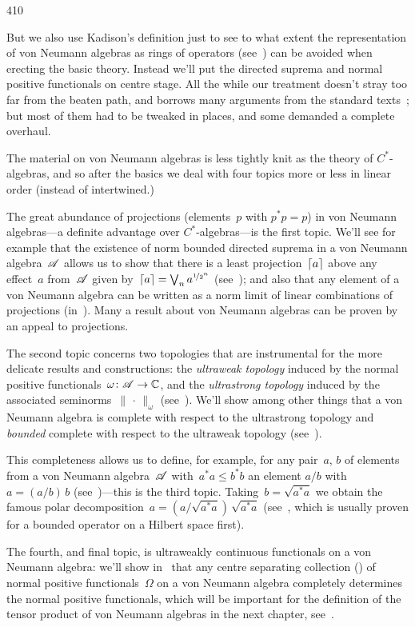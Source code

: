 \begin{parsec}{410}
\begin{point}{10}
But we also use Kadison's definition
just to see
to what extent the representation
of von Neumann algebras
as rings of operators (see~) can be avoided
when erecting the basic theory.
Instead we'll put the directed suprema and normal 
positive functionals
on centre stage.
All the while
our treatment doesn't stray too far
from the beaten path,
and borrows
many arguments
from
the standard texts~\cite{sakai,kr};
but  most of them had to be tweaked in places, and
some demanded a complete overhaul.

The material on von Neumann algebras
is less tightly knit as the theory of $C^*$-algebras,
and so after the basics
we deal with four topics
more or less in linear order
(instead of intertwined.)

The great abundance of projections
(elements~$p$ with $p^*p=p$)
in von Neumann algebras---a definite advantage
over $C^*$-algebras---is
the first topic.
We'll see for example that
the existence of norm bounded directed suprema
in a von Neumann algebra~$\mathscr{A}$
allows us to show
that
there is a least projection~$\left\lceil a\right\rceil$
above any effect~$a$ from~$\mathscr{A}$
given by~$\left\lceil a\right\rceil=\bigvee_n a^{\nicefrac{1}{2}^n}$
(see~);
and also that any element of a von Neumann algebra
can be written as a norm limit
of linear combinations of projections (in~).
Many a result about von Neumann algebras
can be proven by an appeal to projections.

The second topic concerns
two topologies that are instrumental
for the more delicate results and constructions:
the \emph{ultraweak topology}
induced by the normal positive functionals~$\omega\colon\mathscr{A}\to\mathbb{C}$,
and the \emph{ultrastrong topology}
induced by the associated seminorms~$\|\,\cdot\,\|_\omega$
(see~).
We'll show among other things that a von Neumann algebra
is complete with respect to the ultrastrong topology
and \emph{bounded} complete with respect to the ultraweak topology
(see~).

This completeness allows us to
define,
for example,
for any pair~$a$, $b$ of elements
from a von Neumann algebra~$\mathscr{A}$
with~$a^*a\leq b^*b$
an element $a/b$
with~$a=(a/b) \, b $
(see~)---this is the third topic.
Taking~$b=\sqrt{a^*a}$ we
obtain
the famous
polar decomposition~$a = (a/\sqrt{a^*a}) \, \sqrt{a^*a}$
(see~,
which is usually proven 
for a bounded operator on a Hilbert space first).

The fourth, and final topic,
is ultraweakly continuous functionals
on a von Neumann algebra:
we'll show
in~
that any centre separating collection ()
of normal positive functionals~$\Omega$
on a von Neumann algebra completely
determines the normal positive functionals,
which will be important for the definition of the tensor
product of von Neumann algebras in the next chapter,
see~.
\end{point}
\end{parsec}
